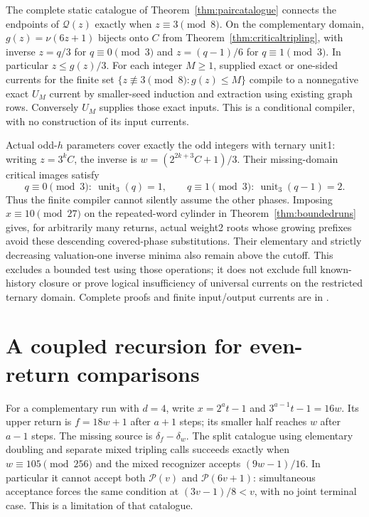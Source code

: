 \documentclass[11pt]{article}
\begin{document}
The complete static catalogue of Theorem~\ref{thm:paircatalogue}
connects the endpoints of $\mathcal Q(z)$ exactly when
$z\equiv3\pmod8$. On the complementary domain,
$g(z)=\nu(6z+1)$ bijects onto $C$ from
Theorem~\ref{thm:criticaltripling}, with inverse
$z=q/3$ for $q\equiv0\pmod3$ and $z=(q-1)/6$ for
$q\equiv1\pmod3$. In particular $z\le g(z)/3$.
For each integer $M\ge1$, supplied exact or one-sided currents
for the finite set $\{z\not\equiv3\pmod8:g(z)\le M\}$
compile to a nonnegative exact $U_M$ current by smaller-seed induction
and extraction using existing graph rows. Conversely $U_M$ supplies
those exact inputs. This is a conditional compiler, with no construction
of its input currents.

Actual odd-$h$ parameters cover exactly the odd integers with ternary
unit1: writing $z=3^kC$, the inverse is
$w=(2^{2k+3}C+1)/3$. Their missing-domain critical images satisfy
\[
 q\equiv0\pmod3:\ \operatorname{unit}_3(q)=1,
 \qquad
 q\equiv1\pmod3:\ \operatorname{unit}_3(q-1)=2.
\]
Thus the finite compiler cannot silently assume the other phases.
Imposing $x\equiv10\pmod{27}$ on the repeated-word cylinder in
Theorem~\ref{thm:boundedruns} gives, for arbitrarily many returns,
actual weight2 roots whose growing prefixes avoid these descending
covered-phase substitutions. Their elementary and strictly decreasing
valuation-one inverse minima also remain above the cutoff.
This excludes a bounded test using those operations; it does not exclude
full known-history closure or prove logical insufficiency of universal
currents on the restricted ternary domain. Complete proofs and finite
input/output currents are in
.

\section{A coupled recursion for even-return comparisons}
For a complementary run with $d=4$, write $x=2^at-1$ and
$3^{a-1}t-1=16w$. Its upper return is $f=18w+1$ after $a+1$
steps; its smaller half reaches $w$ after $a-1$ steps.
The missing source is $\delta_f-\delta_w$.
The split catalogue using elementary doubling and separate mixed tripling
calls succeeds exactly when $w\equiv105\pmod{256}$ and the mixed
recognizer accepts $(9w-1)/16$. In particular it cannot accept both
$\mathcal P(v)$ and $\mathcal P(6v+1)$: simultaneous acceptance forces
the same condition at $(3v-1)/8<v$, with no joint terminal case.
This is a limitation of that catalogue.
\end{document}
